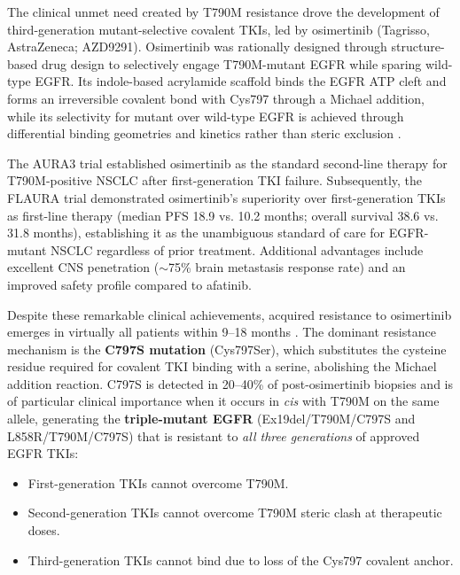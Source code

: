 The clinical unmet need created by T790M resistance drove the development of
third-generation mutant-selective covalent TKIs, led by osimertinib (Tagrisso,
AstraZeneca; AZD9291). Osimertinib was rationally designed through structure-based
drug design to selectively engage T790M-mutant EGFR while sparing wild-type EGFR.
Its indole-based acrylamide scaffold binds the EGFR ATP cleft and forms an
irreversible covalent bond with Cys797 through a Michael addition, while its
selectivity for mutant over wild-type EGFR is achieved through differential
binding geometries and kinetics rather than steric exclusion
\parencite{rotow2023egfr}.

The AURA3 trial established osimertinib as the standard second-line therapy for
T790M-positive NSCLC after first-generation TKI failure. Subsequently, the
FLAURA trial demonstrated osimertinib's superiority over first-generation TKIs
as first-line therapy (median PFS 18.9 vs. 10.2 months; overall survival 38.6
vs. 31.8 months), establishing it as the unambiguous standard of care for
EGFR-mutant NSCLC regardless of prior treatment. Additional advantages include
excellent CNS penetration ($\sim$75\% brain metastasis response rate) and an
improved safety profile compared to afatinib.

Despite these remarkable clinical achievements, acquired resistance to osimertinib
emerges in virtually all patients within 9--18 months \parencite{leonetti2019resistance}.
The dominant resistance mechanism is the \textbf{C797S mutation} (Cys797Ser),
which substitutes the cysteine residue required for covalent TKI binding with a
serine, abolishing the Michael addition reaction. C797S is detected in 20--40\%
of post-osimertinib biopsies and is of particular clinical importance when it
occurs in \textit{cis} with T790M on the same allele, generating the
\textbf{triple-mutant EGFR} (Ex19del/T790M/C797S and L858R/T790M/C797S) that is
resistant to \textit{all three generations} of approved EGFR TKIs:
\begin{itemize}
    \item First-generation TKIs cannot overcome T790M.
    \item Second-generation TKIs cannot overcome T790M steric clash at therapeutic doses.
    \item Third-generation TKIs cannot bind due to loss of the Cys797 covalent anchor.
\end{itemize}

